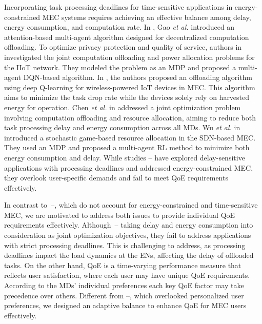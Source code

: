 \documentclass[12pt,draftclsnofoot,onecolumn]{IEEEtran}
\begin{document}
	
	Incorporating task processing deadlines for time-sensitive applications in energy-constrained MEC systems requires achieving an effective balance among delay, energy consumption, and computation rate. 
	In \cite{gao2022large}, Gao \textit{et al.} introduced an attention-based multi-agent algorithm designed for decentralized computation offloading.
	To optimize privacy protection and quality of service, authors in \cite{wu2024privacy} investigated the joint computation offloading and power allocation problems for the IIoT network. They modeled the problem as an MDP and proposed a multi-agent DQN-based algorithm. 
	In \cite{Bolourian-WCL24}, the authors proposed an offloading algorithm using deep Q-learning for wireless-powered IoT devices in MEC. This algorithm aims to minimize the task drop rate while the devices solely rely on harvested energy for operation. 
	Chen \textit{et al.} in \cite{chen2021drl} addressed a joint optimization problem involving computation offloading and resource allocation, aiming to reduce both task processing delay and energy consumption across all MDs.
	Wu \textit{et al.} in \cite{wu2023computation} introduced a stochastic game-based resource allocation in the SDN-based MEC. They used an MDP and proposed a multi-agent RL method to minimize both energy consumption and delay. While studies \cite{gao2022large}--\cite{wu2023computation} have explored delay-sensitive applications with processing deadlines and addressed energy-constrained MEC, they overlook user-specific demands and fail to meet QoE requirements effectively.
	
	
	
	
	In contrast to~\cite{zhang2023offline}--\cite{huang2021deadline}, which do not account for energy-constrained and time-sensitive MEC, we are motivated to address both issues to provide individual QoE requirements effectively. 
	Although~\cite{liao2023online}--\cite{she2024efficient} taking delay and energy consumption into consideration as joint optimization objectives, they fail to address applications with strict processing deadlines. This is challenging to address, as processing deadlines impact the load dynamics at the ENs, affecting the delay of offloaded tasks.  
	On the other hand, QoE is a time-varying performance measure that reflects user satisfaction, where each user may have unique QoE requirements. According to the MDs' individual preferences each key QoE factor may take precedence over others. Different from \cite{gao2022large}--\cite{wu2023computation}, which overlooked personalized user preferences, we designed an adaptive balance to enhance QoE for MEC users effectively. 
	
\end{document}
